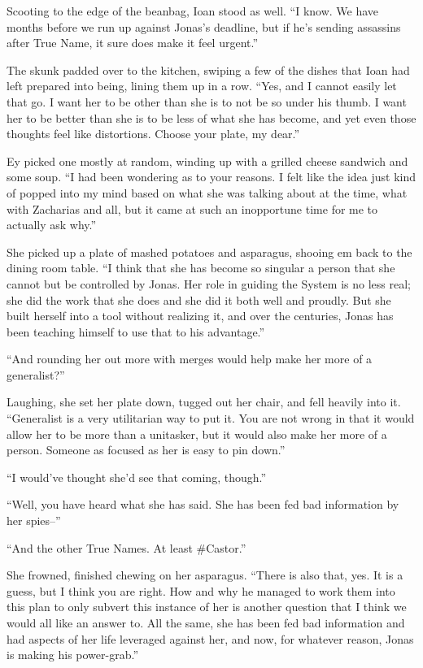 Scooting to the edge of the beanbag, Ioan stood as well. ``I know. We have months before we run up against Jonas's deadline, but if he's sending assassins after True Name, it sure does make it feel urgent.''

The skunk padded over to the kitchen, swiping a few of the dishes that Ioan had left prepared into being, lining them up in a row. ``Yes, and I cannot easily let that go. I want her to be other than she is to not be so under his thumb. I want her to be better than she is to be less of what she has become, and yet even those thoughts feel like distortions. Choose your plate, my dear.''

Ey picked one mostly at random, winding up with a grilled cheese sandwich and some soup. ``I had been wondering as to your reasons. I felt like the idea just kind of popped into my mind based on what she was talking about at the time, what with Zacharias and all, but it came at such an inopportune time for me to actually ask why.''

She picked up a plate of mashed potatoes and asparagus, shooing em back to the dining room table. ``I think that she has become so singular a person that she cannot but be controlled by Jonas. Her role in guiding the System is no less real; she did the work that she does and she did it both well and proudly. But she built herself into a tool without realizing it, and over the centuries, Jonas has been teaching himself to use that to his advantage.''

``And rounding her out more with merges would help make her more of a generalist?''

Laughing, she set her plate down, tugged out her chair, and fell heavily into it. ``Generalist is a very utilitarian way to put it. You are not wrong in that it would allow her to be more than a unitasker, but it would also make her more of a person. Someone as focused as her is easy to pin down.''

``I would've thought she'd see that coming, though.''

``Well, you have heard what she has said. She has been fed bad information by her spies--''

``And the other True Names. At least \#Castor.''

She frowned, finished chewing on her asparagus. ``There is also that, yes. It is a guess, but I think you are right. How and why he managed to work them into this plan to only subvert this instance of her is another question that I think we would all like an answer to. All the same, she has been fed bad information and had aspects of her life leveraged against her, and now, for whatever reason, Jonas is making his power-grab.''

